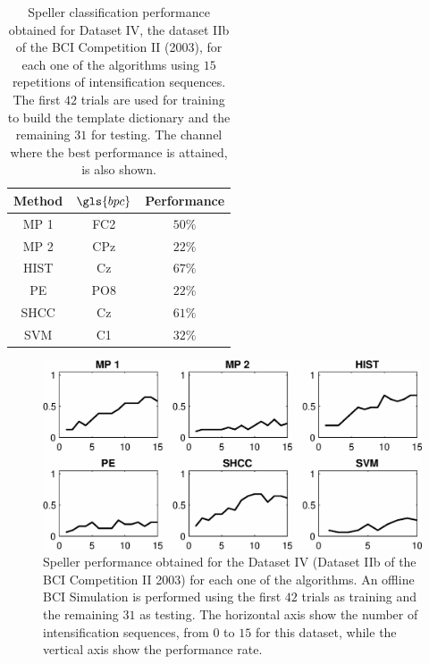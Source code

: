 \begin{table}[h!]
\caption[Dataset IIb BCI Competition II (2003) Speller Performance]{Speller classification performance obtained for Dataset IV, the dataset IIb of the BCI Competition II (2003), for each one of the algorithms using $15$ repetitions of intensification sequences. The first $42$ trials are used for training to build the template dictionary and the remaining $31$ for testing. The channel where the best performance is attained, is also shown. }
\centering
\begin{tabular}{ccc}
\toprule
\textbf{Method}	& \textbf{$\gls{bpc}$} &  \textbf{Performance} \\
\midrule
MP 1 & FC2  & $50\%$ \\
MP 2 & CPz & $22\%$ \\
HIST  & Cz & $67\%$ \\
PE     & PO8 & $22\%$ \\
SHCC & Cz & $61\%$ \\
SVM     & C1  & $32\%$ \\
\bottomrule
\end{tabular}
\label{tab:bcicompetitionresults}
\end{table}

\begin{figure}[h!]
\centering
\includegraphics[width=15cm]{images/PerformanceBCICompetition.eps}
\caption[Dataset IIb BCI Competition II (2003) Speller Performance]{Speller performance obtained for the Dataset IV (Dataset IIb of the BCI Competition II 2003) for each one of the algorithms.  An offline BCI Simulation is performed using the first $42$ trials as training and the remaining $31$ as testing.  The horizontal axis show the number of intensification sequences, from $0$ to $15$ for this dataset, while the vertical axis show the performance rate.}
\label{fig:performancebcicompetition}
\end{figure}

